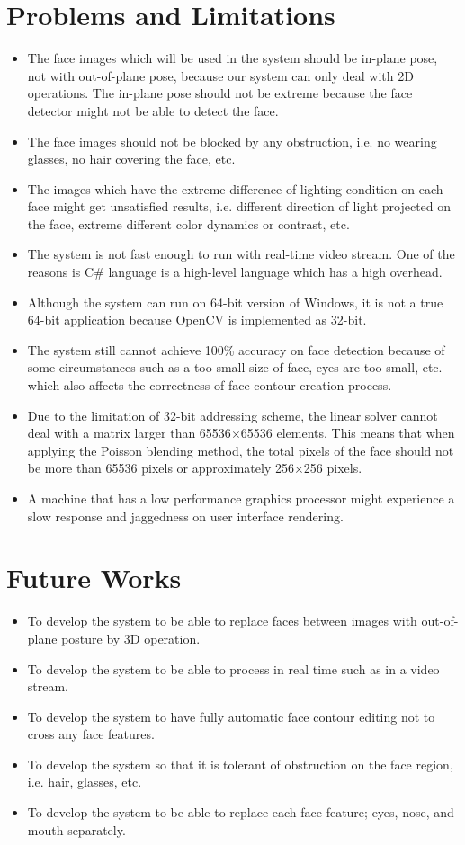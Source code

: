 \section{Problems and Limitations}
\begin{itemize}
\item The face images which will be used in the system should be in-plane pose, not with out-of-plane pose, because our system can only deal with 2D operations. The in-plane pose should not be extreme because the face detector might not be able to detect the face.
\item The face images should not be blocked by any obstruction, i.e. no wearing glasses, no hair covering the face, etc.
\item The images which have the extreme difference of lighting condition on each face might get unsatisfied results, i.e. different direction of light projected on the face, extreme different color dynamics or contrast, etc.
\item The system is not fast enough to run with real-time video stream. One of the reasons is C\# language is a high-level language which has a high overhead.
\item Although the system can run on 64-bit version of Windows, it is not a true 64-bit application because OpenCV is implemented as 32-bit.
\item The system still cannot achieve 100\% accuracy on face detection because of some circumstances such as a too-small size of face, eyes are too small, etc. which also affects the correctness of face contour creation process.
\item Due to the limitation of 32-bit addressing scheme, the linear solver cannot deal with a matrix larger than 65536${\times}$65536 elements. This means that when applying the Poisson blending method, the total pixels of the face should not be more than 65536 pixels or approximately 256${\times}$256 pixels.
\item A machine that has a low performance graphics processor might experience a slow response and jaggedness on user interface rendering.
\end{itemize}

\section{Future Works}
\begin{itemize}
\item To develop the system to be able to replace faces between images with out-of-plane posture by 3D operation.
\item To develop the system to be able to process in real time such as in a video stream.
\item To develop the system to have fully automatic face contour editing not to cross any face features.
\item To develop the system so that it is tolerant of obstruction on the face region, i.e. hair, glasses, etc.
\item To develop the system to be able to replace each face feature; eyes, nose, and mouth separately.
\end{itemize} 